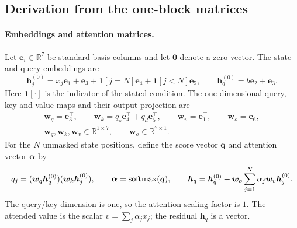 \subsection{Derivation from the one-block matrices}
\label{app:network-proof}
\label{app:architecture}
\paragraph{Embeddings and attention matrices.}
Let $\bm e_i\in\mathbb R^7$ be standard basis columns and let $\bm0$ denote a zero vector.
The state and query embeddings are
\begin{equation}
 \bm h_j^{(0)}=x_j\bm e_1+\bm e_3+\mathbf1[j=N]\bm e_4+\mathbf1[j<N]\bm e_5,
 \qquad \bm h_q^{(0)}=b\bm e_2+\bm e_3.
 \label{eq:embeddings}
\end{equation}
Here $\mathbf1[\cdot]$ is the indicator of the stated condition.
The one-dimensional query, key and value maps and their output projection are
\begin{equation}
 \begin{gathered}
 \bm w_q=\bm e_3^\top,\qquad
 \bm w_k=q_s\bm e_4^\top+q_d\bm e_5^\top,\qquad
 \bm w_v=\bm e_1^\top,\qquad \bm w_o=\bm e_6,\\
 \bm w_q,\bm w_k,\bm w_v\in\mathbb R^{1\times7},\qquad
 \bm w_o\in\mathbb R^{7\times1}.
 \end{gathered}
 \label{eq:attention-matrices}
\end{equation}
For the $N$ unmasked state positions, define the score vector $\bm q$ and attention vector $\bm\alpha$ by
\begin{equation}
 q_j=(\bm w_q\bm h_q^{(0)})(\bm w_k\bm h_j^{(0)}),\qquad
 \bm\alpha=\operatorname{softmax}(\bm q),\qquad
 \bm h_q=\bm h_q^{(0)}+\bm w_o\sum_{j=1}^N \alpha_j\bm w_v\bm h_j^{(0)}.
 \label{eq:attention-block}
\end{equation}
The query/key dimension is one, so the attention scaling factor is $1$.
The attended value is the scalar $v=\sum_j \alpha_j x_j$; the residual $\bm h_q$ is a vector.

